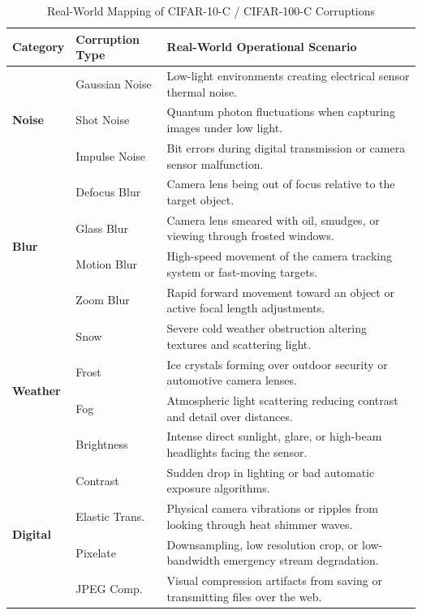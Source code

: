 \begin{table}[htbp]
\centering
\caption{Real-World Mapping of CIFAR-10-C / CIFAR-100-C Corruptions}
\label{tab:cifar_corruptions}
\vspace{0.5em}
\begin{tabularx}{\textwidth}{l l X}
\toprule
\textbf{Category} & \textbf{Corruption Type} & \textbf{Real-World Operational Scenario} \\
\midrule
\multirow{3}{*}{\textbf{Noise}} 
    & Gaussian Noise & Low-light environments creating electrical sensor thermal noise. \\
    & Shot Noise     & Quantum photon fluctuations when capturing images under low light. \\
    & Impulse Noise  & Bit errors during digital transmission or camera sensor malfunction. \\
\midrule
\multirow{4}{*}{\textbf{Blur}} 
    & Defocus Blur   & Camera lens being out of focus relative to the target object. \\
    & Glass Blur     & Camera lens smeared with oil, smudges, or viewing through frosted windows. \\
    & Motion Blur    & High-speed movement of the camera tracking system or fast-moving targets. \\
    & Zoom Blur      & Rapid forward movement toward an object or active focal length adjustments. \\
\midrule
\multirow{4}{*}{\textbf{Weather}} 
    & Snow           & Severe cold weather obstruction altering textures and scattering light. \\
    & Frost          & Ice crystals forming over outdoor security or automotive camera lenses. \\
    & Fog            & Atmospheric light scattering reducing contrast and detail over distances. \\
    & Brightness     & Intense direct sunlight, glare, or high-beam headlights facing the sensor. \\
\midrule
\multirow{4}{*}{\textbf{Digital}} 
    & Contrast       & Sudden drop in lighting or bad automatic exposure algorithms. \\
    & Elastic Trans. & Physical camera vibrations or ripples from looking through heat shimmer waves. \\
    & Pixelate       & Downsampling, low resolution crop, or low-bandwidth emergency stream degradation. \\
    & JPEG Comp.     & Visual compression artifacts from saving or transmitting files over the web. \\
\bottomrule
\end{tabularx}
\end{table}
